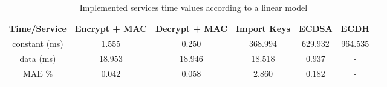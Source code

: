 \begin{table}[h!]
\centering
\def\arraystretch{1.5}
\begin{tabular}{|c|c|c|c|c|c|c|}
\hline
Time/Service   & Encrypt + MAC	  & Decrypt + MAC  & Import Keys & ECDSA & ECDH   \\ \hline
	constant (ms) & 1.555 & 0.250 & 368.994  & 629.932 & 964.535 \\ \hline
	data (ms) & 18.953 & 18.946 & 18.518 & 0.937 & - \\ \hline
	MAE \%	   & 0.042 & 0.058 & 2.860 & 0.182 & - \\ \hline
\end{tabular}
\caption{Implemented services time values according to a linear model}
\label{tab:services-model}
\end{table}


